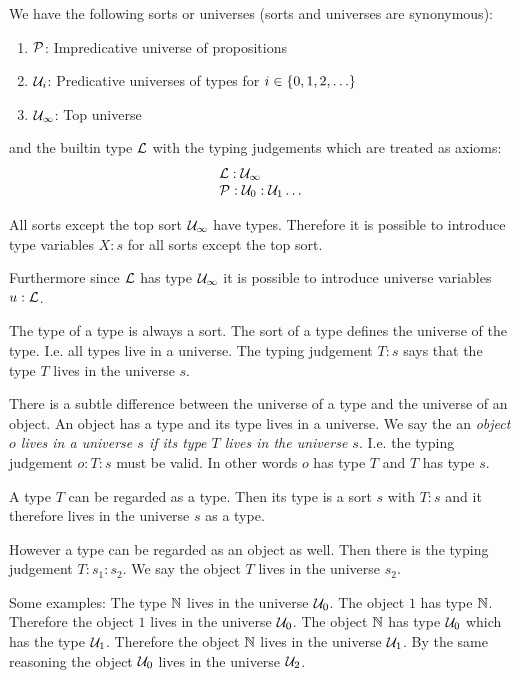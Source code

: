 We have the following sorts or universes (sorts and universes are synonymous):
\begin{enumerate}
\item ${\mathcal P}$: Impredicative universe of propositions

\item ${\mathcal U}_i$: Predicative universes of types for $i \in {\{0, 1, 2, \ldots\}}$

\item ${\mathcal U}_\infty$: Top universe
\end{enumerate}
and the builtin type ${\mathcal L}$ with the typing judgements which are treated as
axioms:
$$
\begin{array}{l}
    {\mathcal L} : {\mathcal U}_\infty
    \\
    {\mathcal P} : {\mathcal U}_0 : {\mathcal U}_1 \ldots
\end{array}
$$


All sorts except the top sort ${\mathcal U}_\infty$ have types. Therefore it is
possible to introduce type variables $X: s$ for all sorts except the top sort.

Furthermore since ${\mathcal L}$ has type ${\mathcal U}_\infty$ it is possible to introduce
universe variables $u: {\mathcal L}$.

The type of a type is always a sort. The sort of a type defines the
universe of the type. I.e. all types live in a universe. The typing judgement
$T: s$ says that the type $T$ lives in the universe $s$.


There is a subtle difference between the universe of a type and the universe of
an object. An object has a type and its type lives in a universe. We say the an
\emph{object $o$ lives in a universe $s$ if its type $T$ lives in the universe
$s$}. I.e. the typing judgement $o : T : s$ must be valid. In other words $o$
has type $T$ and $T$ has type $s$.

A type $T$ can be regarded as a type. Then its type is a sort $s$ with $T : s$
and it therefore lives in the universe $s$ as a type.

However a type can be regarded as an object as well. Then there is the typing
judgement $T: s_1 : s_2$. We say the object $T$ lives in the universe $s_2$.

Some examples: The type ${\mathbb N}$ lives in the universe ${\mathcal U}_0$. The object $1$
has type ${\mathbb N}$. Therefore the object $1$ lives in the universe ${\mathcal U}_0$. The
object ${\mathbb N}$ has type ${\mathcal U}_0$ which has the type ${\mathcal U}_1$. Therefore the
object ${\mathbb N}$ lives in the universe ${\mathcal U}_1$. By the same reasoning the object
${\mathcal U}_0$ lives in the universe ${\mathcal U}_2$.

